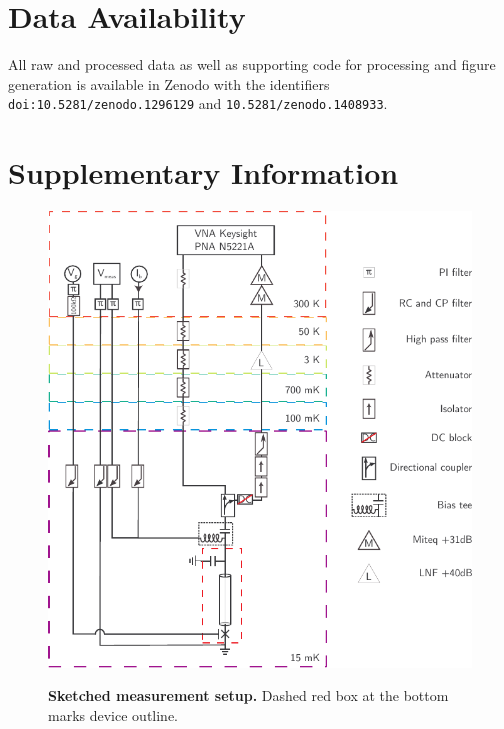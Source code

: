 \section*{Data Availability}
All raw and processed data as well as supporting code for processing and figure generation is available in Zenodo with the identifiers \verb|doi:10.5281/zenodo.1296129|\cite{zenodo1} and \verb|10.5281/zenodo.1408933|\cite{zenodo2}.

\newpage

\section{Supplementary Information}

\begin{figure}[]
	{\centering
		\includegraphics[width=.8\linewidth]{chapter-gJJ/figs/full_setup_cmyk}}
	\caption{{\bf Sketched measurement setup.}
		Dashed red box at the bottom marks device outline.
	}
	\label{fig:setup_full}
\end{figure}

